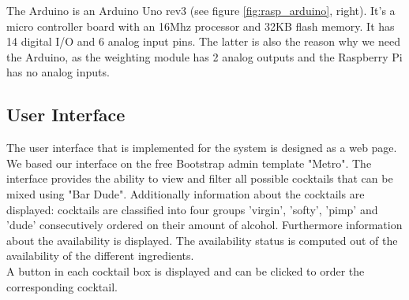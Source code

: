 \documentclass{acm_proc_article-sp}
\begin{document}
The Arduino is an Arduino Uno rev3 (see figure \ref{fig:rasp_arduino}, right). It's a micro controller board with an 16Mhz processor and 32KB flash memory. It has 14 digital I/O and 6 analog input pins. The latter is also the reason why we need the Arduino, as the weighting module has 2 analog outputs and the Raspberry Pi has no analog inputs.

\begin{minipage}{\linewidth}%
\label{fig:rasp_arduino}%
\end{minipage}
 
\subsection{User Interface}
The user interface that is implemented for the system is designed as a web page. We based our interface on the free Bootstrap admin template "Metro". The interface provides the ability to view and filter all possible cocktails that can be mixed using "Bar Dude". Additionally information about the cocktails are displayed: cocktails are classified into four groups 'virgin', 'softy', 'pimp' and 'dude' consecutively ordered on their amount of alcohol. Furthermore information about the availability is displayed. The availability status is computed out of the availability of the different ingredients. \\
A button in each cocktail box is displayed and can be clicked to order the corresponding cocktail.
\end{document}
